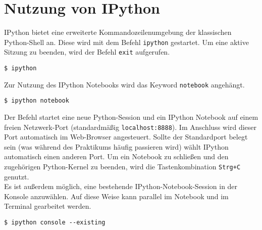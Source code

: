 \documentclass[a4paper]{article}
\begin{document}
\section*{Nutzung von IPython} IPython bietet eine erweiterte Kommandozeilenumgebung der klassischen Python-Shell an. Diese wird mit dem Befehl \verb+ipython+ gestartet. Um eine aktive Sitzung zu beenden, wird der Befehl \verb+exit+ aufgerufen.
\begin{shaded}
\verb+$ ipython+
\end{shaded}

Zur Nutzung des IPython Notebooks wird das Keyword \verb+notebook+ angehängt.
\begin{shaded}
\verb+$ ipython notebook+
\end{shaded}
Der Befehl startet eine neue Python-Session und ein IPython Notebook auf einem freien Netzwerk-Port (standardmäßig \verb+localhost:8888+). Im Anschluss wird dieser Port automatisch im Web-Browser angesteuert. Sollte der Standardport belegt sein (was während des Praktikums häufig passieren wird) wählt IPython automatisch einen anderen Port. Um ein Notebook zu schließen und den zugehörigen Python-Kernel zu beenden, wird die Tastenkombination \verb-Strg+C- genutzt.\\

Es ist außerdem möglich, eine bestehende IPython-Notebook-Session in der Konsole anzuwählen. Auf diese Weise kann parallel im Notebook und im Terminal gearbeitet werden.
\begin{shaded}
\verb+$ ipython console --existing+
\end{shaded}
\end{document}

